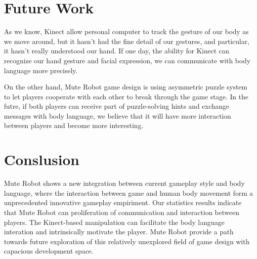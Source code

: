 \documentclass{chi-ext}
\begin{document}




\section{Future Work}

As we know, Kinect allow personal computer to track the gesture of our body as we move around, but it hasn't had the fine detail of our gestures, and particular, it hasn't really understood our hand. If one day, the ability for Kinect can recognize our hand gesture and facial expression, we can communicate with body language more precisely. 

On the other hand, Mute Robot game design is using asymmetric puzzle system to let players cooperate with each other to break through the game stage. In the futre, if both players can receive part of puzzle-solving hints and exchange messages with body language, we believe that it will have more interaction between players and become more interesting.


\section{Conslusion}
Mute Robot shows a new integration between current gameplay style and body language, where the interaction between game and human body movement form a unprecedented innovative gameplay empiriment.
Our statistics results indicate that Mute Robot can proliferation of communication and interaction between players.
The Kinect-based manipulation can facilitate the body language interation and intrinsically motivate the player.
Mute Robot provide a path towards future exploration of this relatively unexplored field of game design with capacious development space.
\end{document}
